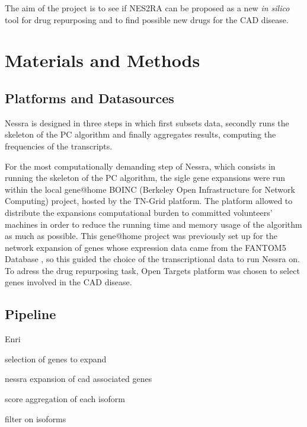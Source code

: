 \documentclass[fleqn,10pt]{SelfArx} %
\begin{document}
The aim of the project is to see if NES2RA can be proposed as a new \textit{in silico} tool for drug repurposing and to find possible new drugs for the CAD disease.  


\section*{Materials and Methods}


\subsection*{Platforms and Datasources}

Nessra is designed in three steps in which first subsets data,
secondly runs the skeleton of the PC algorithm and finally aggregates results, computing the frequencies of the transcripts.

For the most computationally demanding step of Nessra, which consists in running the skeleton of the PC algorithm, the sigle gene expansions were run within the local gene@home \cite{boinc} BOINC (Berkeley Open Infrastructure for Network Computing) project, hosted by the TN-Grid platform. 
The platform allowed to distribute the expansions computational burden to committed volunteers' machines in order to reduce the running time and memory usage of the algorithm as much as possible.
This gene@home project was previously set up for the network expansion of genes whose expression data came from the FANTOM5 Database \cite{fantom}, so this guided the choice of the transcriptional data to run Nessra on.
To adress the drug repurposing task, Open Targets\cite{open} platform was chosen to select genes involved in the CAD disease.  


\subsection*{Pipeline}
Enri

selection of genes to expand

nessra expansion of cad associated genes

score aggregation of each isoform

filter on isoforms
\end{document}
